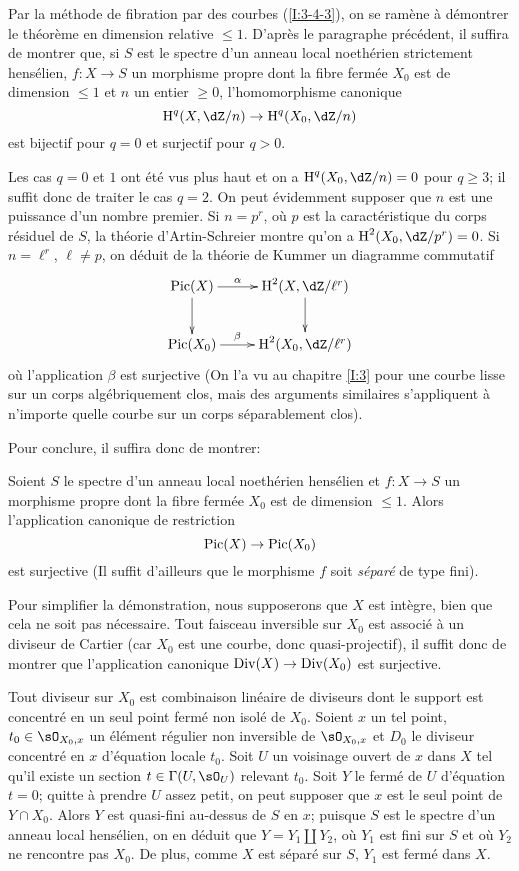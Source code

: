 Par la méthode de fibration par des courbes (\ref{I:3-4-3}), on se ramène 
à démontrer le théorème en dimension relative $\leqslant 1$. D'après 
le paragraphe précédent, il suffira de montrer que, si $S$ est le spectre 
d'un anneau local noethérien strictement hensélien, $f:X\to S$ un 
morphisme propre dont la fibre fermée $X_0$ est de dimension $\leqslant 1$ 
et $n$ un entier $\geqslant 0$, l'homomorphisme canonique 
\[
  \h^q(X,\dZ/n) \to \h^q(X_0,\dZ/n)
\]
est bijectif pour $q=0$ et surjectif pour $q>0$. 

Les cas $q=0$ et $1$ ont été vus plus haut et on a $\h^q(X_0,\dZ/n) = 0$ 
pour $q\geqslant 3$; il suffit donc de traiter le cas $q=2$. On peut 
évidemment supposer que $n$ est une puissance d'un nombre premier. Si 
$n=p^r$, où $p$ est la caractéristique du corps résiduel de $S$, la 
théorie d'Artin-Schreier montre qu'on a $\h^2(X_0,\dZ/p^r) = 0$. Si 
$n=\ell^r$, $\ell\ne p$, on déduit de la théorie de Kummer un diagramme 
commutatif 
\[\xymatrix{
  \pic(X) \ar[d] \ar[r]^-\alpha 
    & \h^2(X,\dZ/\ell^r) \ar[d] \\
  \pic(X_0) \ar[r]^-\beta 
    & \h^2(X_0,\dZ/\ell^r)
}\]
où l'application $\beta$ est surjective (On l'a vu au chapitre \ref{I:3} pour 
une courbe lisse sur un corps algébriquement clos, mais des arguments 
similaires s'appliquent à n'importe quelle courbe sur un corps 
séparablement clos). 

Pour conclure, il suffira donc de montrer:





\begin{proposition}\label{I:4-4-1}
Soient $S$ le spectre d'un anneau local noethérien hensélien et $f:X\to S$ 
un morphisme propre dont la fibre fermée $X_0$ est de dimension 
$\leqslant 1$. Alors l'application canonique de restriction 
\[
  \operatorname{Pic}(X)\to \operatorname{Pic}(X_0)
\]
est surjective (Il suffit d'ailleurs que le morphisme $f$ soit 
\emph{séparé} de type fini). 
\end{proposition}

Pour simplifier la démonstration, nous supposerons que $X$ est intègre, 
bien que cela ne soit pas nécessaire. Tout faisceau inversible sur $X_0$ est 
associé à un diviseur de Cartier (car $X_0$ est une courbe, donc 
quasi-projectif), il suffit donc de montrer que l'application canonique 
$\operatorname{Div}(X)\to\operatorname{Div}(X_0)$ est surjective. 

Tout diviseur sur $X_0$ est combinaison linéaire de diviseurs dont le 
support est concentré en un seul point fermé non isolé de $X_0$. Soient 
$x$ un tel point, $t_0\in\sO_{X_0,x}$ un élément régulier non inversible 
de $\sO_{X_0,x}$ et $D_0$ le diviseur concentré en $x$ d'équation locale 
$t_0$. Soit $U$ un voisinage ouvert de $x$ dans $X$ tel qu'il existe un section 
$t\in \Gamma(U,\sO_U)$ relevant $t_0$. Soit $Y$ le fermé de $U$ d'équation 
$t=0$; quitte à prendre $U$ assez petit, on peut supposer que $x$ est le 
seul point de $Y\cap X_0$. Alors $Y$ est quasi-fini au-dessus de $S$ en $x$; 
puisque $S$ est le spectre d'un anneau local hensélien, on en déduit que 
$Y=Y_1\amalg Y_2$, où $Y_1$ est fini sur $S$ et où $Y_2$ ne rencontre pas 
$X_0$. De plus, comme $X$ est séparé sur $S$, $Y_1$ est fermé dans $X$. 

